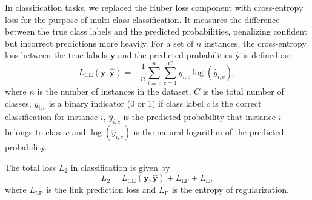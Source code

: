 {In classification tasks, we replaced the Huber loss component with cross-entropy loss for the purpose of multi-class classification. It measures the difference between the true class labels and the predicted probabilities, penalizing confident but incorrect predictions more heavily. For a set of \(n\) instances, the cross-entropy loss between the true labels \(\mathbf{y}\) and the predicted probabilities \(\mathbf{\hat{y}}\) is defined as:
\begin{equation}
    L_{\text{CE}}(\mathbf{y}, \mathbf{\hat{y}}) = -\frac{1}{n} \sum_{i=1}^{n} \sum_{c=1}^{C} y_{i,c} \log(\hat{y}_{i,c}),
    \label{equation::cross_entropy_loss}
\end{equation}
where \(n\) is the number of instances in the dataset, \(C\) is the total number of classes, \(y_{i,c}\) is a binary indicator (0 or 1) if class label \(c\) is the correct classification for instance \(i\), \(\hat{y}_{i,c}\) is the predicted probability that instance \(i\) belongs to class \(c\) and \(\log(\hat{y}_{i,c})\) is the natural logarithm of the predicted probability.

The total loss $L_2$ in classification is given by
\begin{equation}
    \textit{$L_2$} =  L_{\text{CE}}(\mathbf{y}, \mathbf{\hat{y}}) + \textit{L}_\text{LP} + \textit{L}_\text{E},
    \label{equation::total_loss_cls}
\end{equation}
where $\textit{L}_\text{LP}$ is the link prediction loss and $\textit{L}_\text{E}$ is the entropy of regularization.

\clearpage
}
